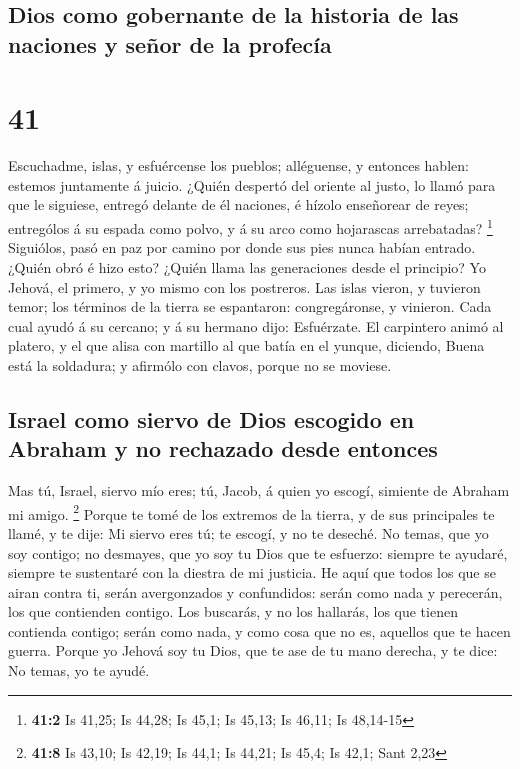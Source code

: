 \hypertarget{dios-como-gobernante-de-la-historia-de-las-naciones-y-seuxf1or-de-la-profecuxeda}{%
\subsection{Dios como gobernante de la historia de las naciones y señor
de la
profecía}\label{dios-como-gobernante-de-la-historia-de-las-naciones-y-seuxf1or-de-la-profecuxeda}}

\hypertarget{section-40}{%
\section{41}\label{section-40}}

 Escuchadme, islas, y esfuércense los pueblos; alléguense,
y entonces hablen: estemos juntamente á juicio.  ¿Quién
despertó del oriente al justo, lo llamó para que le siguiese, entregó
delante de él naciones, é hízolo enseñorear de reyes; entrególos á su
espada como polvo, y á su arco como hojarascas arrebatadas? \footnote{\textbf{41:2}
  Is 41,25; Is 44,28; Is 45,1; Is 45,13; Is 46,11; Is 48,14-15}
 Siguiólos, pasó en paz por camino por donde sus pies
nunca habían entrado.  ¿Quién obró é hizo esto? ¿Quién
llama las generaciones desde el principio? Yo Jehová, el primero, y yo
mismo con los postreros.  Las islas vieron, y tuvieron
temor; los términos de la tierra se espantaron: congregáronse, y
vinieron.  Cada cual ayudó á su cercano; y á su hermano
dijo: Esfuérzate.  El carpintero animó al platero, y el
que alisa con martillo al que batía en el yunque, diciendo, Buena está
la soldadura; y afirmólo con clavos, porque no se moviese.

\hypertarget{israel-como-siervo-de-dios-escogido-en-abraham-y-no-rechazado-desde-entonces}{%
\subsection{Israel como siervo de Dios escogido en Abraham y no
rechazado desde
entonces}\label{israel-como-siervo-de-dios-escogido-en-abraham-y-no-rechazado-desde-entonces}}

 Mas tú, Israel, siervo mío eres; tú, Jacob, á quien yo
escogí, simiente de Abraham mi amigo. \footnote{\textbf{41:8} Is 43,10;
  Is 42,19; Is 44,1; Is 44,21; Is 45,4; Is 42,1; Sant 2,23}
 Porque te tomé de los extremos de la tierra, y de sus
principales te llamé, y te dije: Mi siervo eres tú; te escogí, y no te
deseché.  No temas, que yo soy contigo; no desmayes, que
yo soy tu Dios que te esfuerzo: siempre te ayudaré, siempre te
sustentaré con la diestra de mi justicia.  He aquí que
todos los que se airan contra ti, serán avergonzados y confundidos:
serán como nada y perecerán, los que contienden contigo. 
Los buscarás, y no los hallarás, los que tienen contienda contigo; serán
como nada, y como cosa que no es, aquellos que te hacen guerra.
 Porque yo Jehová soy tu Dios, que te ase de tu mano
derecha, y te dice: No temas, yo te ayudé.

